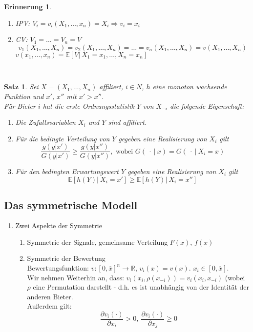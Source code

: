 \documentclass[12pt]{extreport} %
\newcommand{\R}{\mathbb{R}}
\theoremstyle{named}
\theoremstyle{itshape}
\newtheorem{satz}[unnamedtheorem]{Satz}
\theoremstyle{normal}
\newtheorem*{erinnerung}{Erinnerung}
\begin{document}
\begin{erinnerung} ~\
	\begin{enumerate}
		\item IPV: $V_{i} = v_{i}(X_1, \dotsc, x_{n}) = X_{i} \Rightarrow v_i = x_i$
		\item CV: $V_1 = \dotsc = V_n = V$
			$$v_1(X_1, \dotsc, X_n) = v_2(X_1, \dotsc, X_n) = \dotsc = v_n(X_1, \dotsc, X_n) = v(X_1, \dotsc, X_n)$$
			$v(x_1, \dotsc, x_n) = \mathbb{E}\left[ V |~X_1 = x_1, \dotsc, X_n = x_n \right]$
	\end{enumerate}		
\end{erinnerung}
~\newline
\begin{satz}
	Sei $X = (X_1, \dotsc, X_n)$ affiliert, $i \in N$, $h$ eine monoton wachsende Funktion und $x'$, $x''$ mit $x' > x''$. ~\\
	
	Für Bieter $i$ hat die erste Ordnungsstatistik $Y$ von $X_{-i}$ die folgende Eigenschaft:
	\begin{enumerate}
		\item Die Zufallsvariablen $X_{i}$ und $Y$ sind affiliert.
		\item Für die bedingte Verteilung von $Y$ gegeben eine Realisierung von $X_i$ gilt
			$$ \frac{g(y|x')}{G(y|x')} \geq \frac{g(y|x'')}{G(y|x'')}, \text{ wobei } G(~\cdot ~ | ~ x) = G(~\cdot ~ | ~ X_{i} = x) $$
		\item Für den bedingten Erwartungswert $Y$ gegeben eine Realisierung von $X_i$ gilt
			$$  \mathbb{E}\left[ h(Y) \big| ~ X_{i} = x' \right] \geq \mathbb{E}\left[ h(Y) \big| ~ X_{i} = x'' \right] $$
	\end{enumerate}
\end{satz}

\subsection{Das symmetrische Modell}

\begin{enumerate}[label=\alph*\upshape)]
	\item Zwei Aspekte der Symmetrie
		\begin{enumerate}[label=\arabic*.]
			\item Symmetrie der Signale, gemeinsame Verteilung $F(x)$, $f(x)$
			\item Symmetrie der Bewertung ~\\
				Bewertungsfunktion: $v \colon [0, \overline{x}]^{n} \rightarrow \R$, $v_{i}(x) = v(x)$. $x_{i} \in [0, \overline{x}]$. ~\\
				
				Wir nehmen Weiterhin an, dass: $v_{i}(x_{i}, \rho(x_{-i})) = v_{i}(x_{i}, x_{-i})$ (wobei $\rho$ eine Permutation darstellt - d.h. es ist unabhängig von der Identität der anderen Bieter. ~\\
				
				Außerdem gilt: 
				$$ \frac{\partial v_{i}(\cdot)}{\partial x_{i}} > 0, ~\frac{\partial v_{i}(\cdot)}{\partial x_{j}} \geq 0 $$		
		\end{enumerate}
\end{enumerate}
\end{document}
